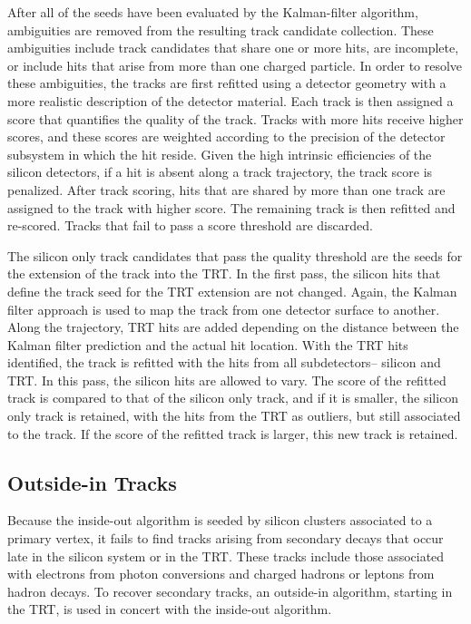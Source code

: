 After all of the seeds have been evaluated by the Kalman-filter
algorithm, ambiguities are removed from the resulting track candidate
collection. These ambiguities include track candidates that share one
or more hits, are incomplete, or include hits that arise from more
than one charged particle. In order to resolve these ambiguities, the
tracks are first refitted using a detector geometry with a more
realistic description of the detector material. Each track is then
assigned a score that quantifies the quality of the track. Tracks with
more hits receive higher scores, and these scores are weighted
according to the precision of the detector subsystem in which the hit
reside. Given the high intrinsic efficiencies of the silicon
detectors, if a hit is absent along a track trajectory, the track
score is penalized. After track scoring, hits that are shared by more
than one track are assigned to the track with higher score. The
remaining track is then refitted and re-scored. Tracks that fail to
pass a score threshold are discarded.

The silicon only track candidates that pass the quality threshold are
the seeds for the extension of the track into the TRT. In
the first pass, the silicon hits that define the track seed for the
TRT extension are not changed. Again, the Kalman filter approach is
used to map the track from one detector surface to another. Along the
trajectory, TRT hits are added depending on the distance between the
Kalman filter prediction and the actual hit location. With the TRT hits
identified, the track is refitted with the hits from all
subdetectors-- silicon and TRT. In this pass, the silicon hits are
allowed to vary. The score of the refitted track is compared to that of
the silicon only track, and if it is smaller, the silicon only track
is retained, with the hits from the TRT as outliers, but still
associated to the track. If the score of the refitted track is larger,
this new track is retained. 

\subsection{Outside-in Tracks}

Because the inside-out algorithm is seeded by silicon clusters
associated to a primary vertex, it fails to find tracks arising from
secondary decays that occur late in the silicon system or in the
TRT. These tracks include those associated with electrons
from photon conversions and charged hadrons or leptons from hadron
decays. To recover secondary tracks, an outside-in algorithm, starting
in the TRT, is used in concert with the inside-out algorithm. 

